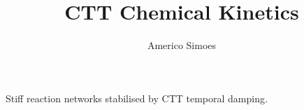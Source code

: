 \documentclass[12pt]{article}
\begin{document}
\title{CTT Chemical Kinetics}
\author{Americo Simoes}
\maketitle
Stiff reaction networks stabilised by CTT temporal damping.
\end{document}
